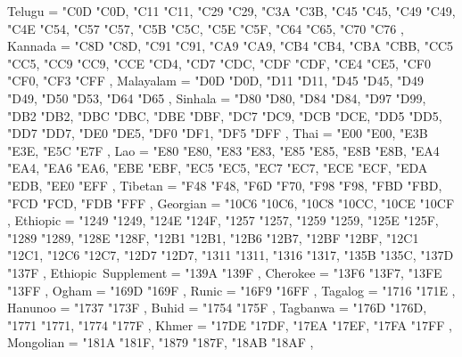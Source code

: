 {    Telugu                                         = { {"C0D} {"C0D}, {"C11} {"C11}, {"C29} {"C29}, {"C3A} {"C3B}, {"C45} {"C45}, {"C49} {"C49}, {"C4E} {"C54}, {"C57} {"C57}, {"C5B} {"C5C}, {"C5E} {"C5F}, {"C64} {"C65}, {"C70} {"C76} },
    Kannada                                        = { {"C8D} {"C8D}, {"C91} {"C91}, {"CA9} {"CA9}, {"CB4} {"CB4}, {"CBA} {"CBB}, {"CC5} {"CC5}, {"CC9} {"CC9}, {"CCE} {"CD4}, {"CD7} {"CDC}, {"CDF} {"CDF}, {"CE4} {"CE5}, {"CF0} {"CF0}, {"CF3} {"CFF} },
    Malayalam                                      = { {"D0D} {"D0D}, {"D11} {"D11}, {"D45} {"D45}, {"D49} {"D49}, {"D50} {"D53}, {"D64} {"D65} },
    Sinhala                                        = { {"D80} {"D80}, {"D84} {"D84}, {"D97} {"D99}, {"DB2} {"DB2}, {"DBC} {"DBC}, {"DBE} {"DBF}, {"DC7} {"DC9}, {"DCB} {"DCE}, {"DD5} {"DD5}, {"DD7} {"DD7}, {"DE0} {"DE5}, {"DF0} {"DF1}, {"DF5} {"DFF} },
    Thai                                           = { {"E00} {"E00}, {"E3B} {"E3E}, {"E5C} {"E7F} },
    Lao                                            = { {"E80} {"E80}, {"E83} {"E83}, {"E85} {"E85}, {"E8B} {"E8B}, {"EA4} {"EA4}, {"EA6} {"EA6}, {"EBE} {"EBF}, {"EC5} {"EC5}, {"EC7} {"EC7}, {"ECE} {"ECF}, {"EDA} {"EDB}, {"EE0} {"EFF} },
    Tibetan                                        = { {"F48} {"F48}, {"F6D} {"F70}, {"F98} {"F98}, {"FBD} {"FBD}, {"FCD} {"FCD}, {"FDB} {"FFF} },
    Georgian                                       = { {"10C6} {"10C6}, {"10C8} {"10CC}, {"10CE} {"10CF} },
    Ethiopic                                       = { {"1249} {"1249}, {"124E} {"124F}, {"1257} {"1257}, {"1259} {"1259}, {"125E} {"125F}, {"1289} {"1289}, {"128E} {"128F}, {"12B1} {"12B1}, {"12B6} {"12B7}, {"12BF} {"12BF}, {"12C1} {"12C1}, {"12C6} {"12C7}, {"12D7} {"12D7}, {"1311} {"1311}, {"1316} {"1317}, {"135B} {"135C}, {"137D} {"137F} },
    Ethiopic~Supplement                            = { {"139A} {"139F} },
    Cherokee                                       = { {"13F6} {"13F7}, {"13FE} {"13FF} },
    Ogham                                          = { {"169D} {"169F} },
    Runic                                          = { {"16F9} {"16FF} },
    Tagalog                                        = { {"1716} {"171E} },
    Hanunoo                                        = { {"1737} {"173F} },
    Buhid                                          = { {"1754} {"175F} },
    Tagbanwa                                       = { {"176D} {"176D}, {"1771} {"1771}, {"1774} {"177F} },
    Khmer                                          = { {"17DE} {"17DF}, {"17EA} {"17EF}, {"17FA} {"17FF} },
    Mongolian                                      = { {"181A} {"181F}, {"1879} {"187F}, {"18AB} {"18AF} },
}
